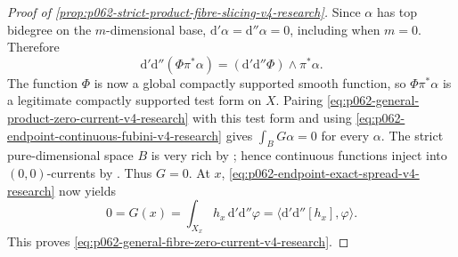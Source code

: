 \begin{proof}[Proof of
\cref{prop:p062-strict-product-fibre-slicing-v4-research}]
Since \(\alpha\) has top bidegree on the \(m\)-dimensional base,
\(
 \mathrm d'\alpha=\mathrm d''\alpha=0
\), including when \(m=0\).  Therefore
\[
 \mathrm d'\mathrm d''(\Phi\pi^*\alpha)
       =(\mathrm d'\mathrm d''\Phi)\wedge\pi^*\alpha.
\]
The function \(\Phi\) is now a global compactly supported smooth function,
so \(\Phi\pi^*\alpha\) is a legitimate compactly supported test form on
\(X\).  Pairing
\eqref{eq:p062-general-product-zero-current-v4-research} with this test form
and using \eqref{eq:p062-endpoint-continuous-fubini-v4-research} gives
\(
 \int_B G\alpha=0
\)
for every \(\alpha\).  The strict pure-dimensional space \(B\) is very
rich by \cite[Theorem~16.4.4(b)]{CLD25}; hence continuous functions inject
into \((0,0)\)-currents by \cite[Corollary~7.3.12]{CLD25}.  Thus \(G=0\).
At \(x\), \eqref{eq:p062-endpoint-exact-spread-v4-research} now yields
\[
 0=G(x)=\int_{X_x}h_x\,\mathrm d'\mathrm d''\varphi
       =\bigl\langle\mathrm d'\mathrm d''[h_x],\varphi\bigr\rangle.
\]
This proves \eqref{eq:p062-general-fibre-zero-current-v4-research}.
\end{proof}

